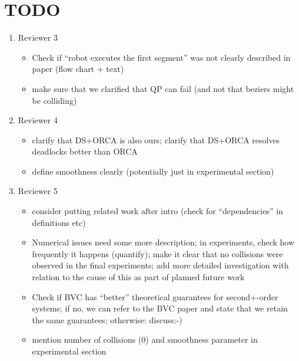 \documentclass{svproc}
\begin{document}
%
%



\section{TODO}

\begin{enumerate}
    \item Reviewer 3
        \begin{itemize}
            \item[\checkmark] Check if ``robot executes the first segment'' was not clearly described in paper (flow chart + text)
            \item[\checkmark] make sure that we clarified that QP can fail (and not that beziers might be colliding)
        \end{itemize}
    \item Reviewer 4
        \begin{itemize}
            \item[\checkmark] clarify that DS+ORCA is also ours; clarify that DS+ORCA resolves deadlocks better than ORCA
            \item[\checkmark] define smoothness clearly (potentially just in experimental section)
        \end{itemize}
    \item Reviewer 5
        \begin{itemize}
            \item[\checkmark] consider putting related work after intro (check for ``dependencies'' in definitions etc)
            \item[\checkmark] Numerical issues need some more description; in experiments, check how frequently it happens (quantify); make it clear that no collisions were observed in the final experiments; add more detailed investigation with relation to the cause of this as part of planned future work
            \item[\checkmark] Check if BVC has ``better'' theoretical guarantees for second+-order systems; if no, we can refer to the BVC paper and state that we retain the same guarantees; otherwise: discuss:-)
            \item[\checkmark] mention number of collisions (0) and smoothness parameter in experimental section
        \end{itemize}
\end{enumerate}

\end{document}
